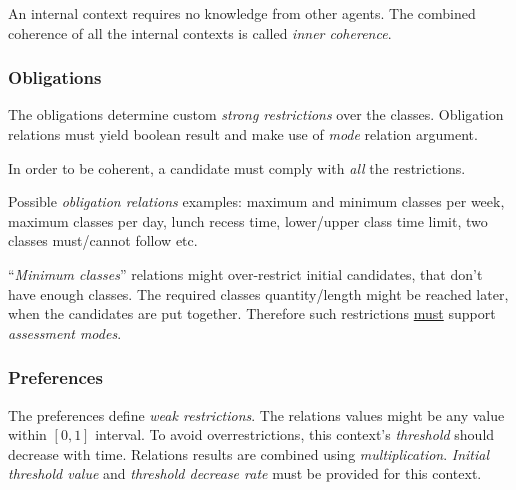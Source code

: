\documentclass[../header]{subfiles}
\begin{document}
\providecommand{\rootdir}{..}


An internal context requires no knowledge from other agents.
The combined coherence of all the internal contexts is called
\emph{inner coherence}.

\subsubsection{Obligations}

The obligations determine custom \emph{strong restrictions} over the classes.
Obligation relations must yield boolean result and make use of
\emph{mode} relation argument.

In order to be coherent, a candidate must comply with \emph{all} the restrictions.

\medskip

Possible \emph{obligation relations} examples:
maximum and minimum classes per week, maximum classes per day,
lunch recess time, lower/upper class time limit, two classes must/cannot follow etc.

``\emph{Minimum classes}'' relations might over-restrict initial candidates, that
don't have enough classes. The required classes quantity/length might be reached later,
when the candidates are put together.
Therefore such restrictions \underline{must} support \emph{assessment modes}.


\subsubsection{Preferences}

The preferences define \emph{weak restrictions}. The relations values might be any
value within $[0,1]$ interval. To avoid overrestrictions, this context's \emph{threshold}
should decrease with time. Relations results are combined using \emph{multiplication}.
\emph{Initial threshold value} and \emph{threshold decrease rate} must be
provided for this context.

\end{document}
